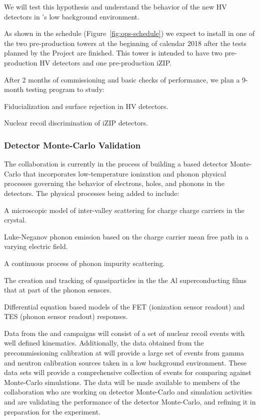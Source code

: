 
We will test this hypothesis and understand the behavior of the new \SuperCDMS HV detectors in \cute's low background environment.

As shown in the schedule (Figure~\ref{fig:ops-schedule}) we expect to install in \cute one of the two pre-production towers at the beginning of calendar 2018 after the tests planned by the \scs Project are finished. This tower is intended to have two pre-production HV detectors and one pre-production iZIP.

After 2 months of commissioning and basic checks of performance, we plan a 9-month testing program to study:
\begin{compactitem}
\item  Fiducialization and surface rejection in HV detectors.
\item  Nuclear recoil discrimination of iZIP detectors.   
\end{compactitem}

\subsubsection{Detector Monte-Carlo Validation}
\label{sec:dmc}

The \SuperCDMS collaboration is currently in the process of building a \geant based detector Monte-Carlo that incorporates low-temperature ionization and phonon physical processes governing the behavior of electrons, holes, and phonons in the \SuperCDMS detectors. The physical processes being added to \geant include:
\begin{compactitem}
\item A microscopic model of inter-valley scattering for charge charge carriers in the crystal.
\item Luke-Neganov phonon emission based on the charge carrier mean free path in a varying electric field.
\item A continuous process of phonon impurity scattering.
\item The creation and tracking of quasiparticles in the the Al superconducting films that at part of the phonon sensors.
\item Differential equation based models of the FET (ionization sensor readout) and TES (phonon sensor readout) responses.
\end{compactitem}

Data from the \tunl and \nexus campaigns will consist of a set of nuclear recoil events with well defined kinematics.  Additionally, the data obtained  from the precommissioning calibration at \cute will provide a large set of events from gamma and neutron calibration sources taken in a low background environment. 
These data sets will provide a comprehensive collection of events for comparing against Monte-Carlo simulations. The data will be made available to members of the \SuperCDMS collaboration who are working on detector Monte-Carlo and simulation activities and are validating the performance of the detector Monte-Carlo, and refining it in preparation for the \scs experiment. %

